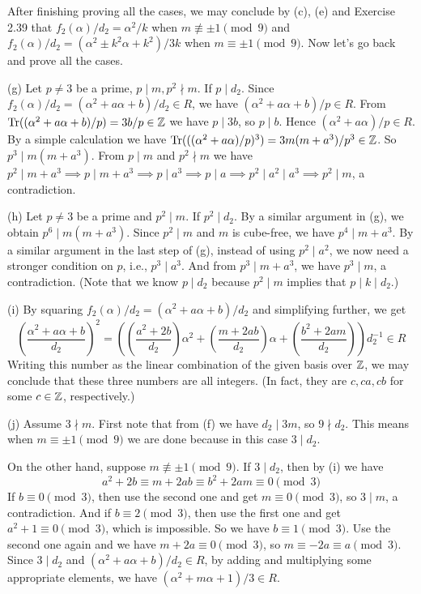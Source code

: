 \documentclass[../Marcus.tex]{subfiles}
\begin{document}
After finishing proving all the cases, we may conclude by (c), (e) and Exercise 2.39 that $f_2(\alpha)/d_2=\alpha^2/k$ when $m\not\equiv \pm1 \pmod{9}$ and $f_2(\alpha)/d_2=(\alpha^2\pm k^2\alpha+k^2)/3k$ when $m\equiv \pm1 \pmod{9}$. Now let's go back and prove all the cases.

(g) Let $p\neq 3$ be a prime, $p\mid m,p^2\nmid m$. If $p\mid d_2$. Since $f_2(\alpha)/d_2=(\alpha^2+a\alpha+b)/d_2\in R$, we have $(\alpha^2+a\alpha+b)/p\in R$. From $\operatorname{Tr}((\alpha^2+a\alpha+b)/p)=3b/p\in\mathbb{Z}$ we have $p\mid 3b$, so $p\mid b$. Hence $(\alpha^2+a\alpha)/p\in R$. By a simple calculation we have $\operatorname{Tr}(((\alpha^2+a\alpha)/p)^3) = 3m(m+a^3)/p^3\in\mathbb{Z}$. So $p^3\mid m(m+a^3)$. From $p\mid m$ and $p^2\nmid m$ we have $p^2\mid m+a^3\implies p\mid m+a^3\implies p\mid a^3\implies p\mid a\implies p^2\mid a^2\mid a^3\implies p^2\mid m$, a contradiction.

(h) Let $p\neq 3$ be a prime and $p^2\mid m$. If $p^2\mid d_2$. By a similar argument in (g), we obtain $p^6\mid m(m+a^3)$. Since $p^2\mid m$ and $m$ is cube-free, we have $p^4\mid m+a^3$. By a similar argument in the last step of (g), instead of using $p^2\mid a^2$, we now need a stronger condition on $p$, i.e., $p^3\mid a^3$. And from $p^3\mid m+a^3$, we have $p^3\mid m$, a contradiction. (Note that we know $p\mid d_2$ because $p^2\mid m$ implies that $p\mid k\mid d_2$.)

(i) By squaring $f_2(\alpha)/d_2=(\alpha^2+a\alpha+b)/d_2$ and simplifying further, we get
$$\left(\frac{\alpha^2+a\alpha+b}{d_2}\right)^2=\left(\left(\frac{a^2+2b}{d_2}\right)\alpha^2+\left(\frac{m+2ab}{d_2}\right)\alpha+\left(\frac{b^2+2am}{d_2}\right)\right) d_2^{-1}\in R$$
Writing this number as the linear combination of the given basis over $\mathbb{Z}$, we may conclude that these three numbers are all integers. (In fact, they are $c,ca,cb$ for some $c\in\mathbb{Z}$, respectively.)

(j) Assume $3\nmid m$. First note that from (f) we have $d_2\mid 3m$, so $9\nmid d_2$. This means when $m\equiv \pm1 \pmod{9}$ we are done because in this case $3\mid d_2$.

On the other hand, suppose $m\not\equiv \pm1 \pmod{9}$. If $3\mid d_2$, then by (i) we have $$a^2+2b\equiv m+2ab\equiv b^2+2am \equiv 0 \pmod{3}$$ If $b\equiv 0\pmod{3}$, then use the second one and get $m\equiv 0\pmod{3}$, so $3\mid m$, a contradiction. And if $b\equiv 2\pmod{3}$, then use the first one and get $a^2+1\equiv 0\pmod{3}$, which is impossible. So we have $b\equiv 1\pmod{3}$. Use the second one again and we have $m+2a\equiv 0\pmod{3}$, so $m\equiv -2a\equiv a \pmod{3}$. Since $3\mid d_2$ and $(\alpha^2+a\alpha+b)/d_2\in R$, by adding and multiplying some appropriate elements, we have $(\alpha^2+m\alpha+1)/3\in R$.
\end{document}
